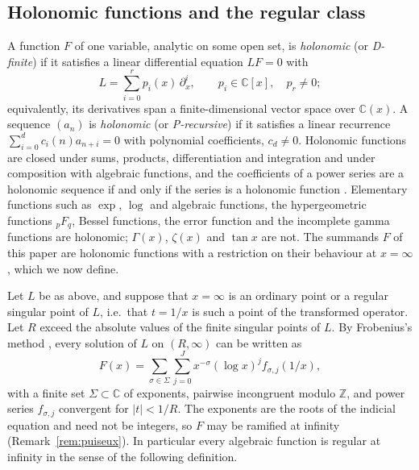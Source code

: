 \documentclass[11pt,reqno]{amsart}
\theoremstyle{definition}
\theoremstyle{remark}
\newcommand{\ZZ}{\mathbb{Z}}
\newcommand{\CC}{\mathbb{C}}
\begin{document}
\subsection{Holonomic functions and the regular class}
A function $F$ of one variable, analytic on some open set, is \emph{holonomic} (or \emph{D-finite}) if it satisfies a
linear differential equation $LF = 0$ with
\[
  L = \sum_{i=0}^r p_i(x)\,\partial_x^i, \qquad p_i \in \CC[x], \quad p_r \ne 0;
\]
equivalently, its derivatives span a finite-dimensional vector space over $\CC(x)$. A sequence $(a_n)$ is
\emph{holonomic} (or \emph{P-recursive}) if it satisfies a linear recurrence $\sum_{i=0}^{d}c_i(n)a_{n+i} = 0$ with
polynomial coefficients, $c_d \ne 0$. Holonomic functions are closed under sums, products, differentiation and
integration and under composition with algebraic functions, and the coefficients of a power series are a holonomic
sequence if and only if the series is a holonomic function \cite{Sta80}. Elementary functions such as $\exp$, $\log$
and algebraic functions, the hypergeometric functions ${}_pF_q$, Bessel functions, the error function and the
incomplete gamma functions are holonomic; $\Gamma(x)$, $\zeta(x)$ and $\tan x$ are not. The summands $F$ of this paper
are holonomic functions with a restriction on their behaviour at $x = \infty$, which we now define.

Let $L$ be as above, and suppose that $x = \infty$ is an ordinary point or a regular singular point of $L$, i.e.\ that $t = 1/x$ is such a point of the transformed
operator. Let $R$ exceed the absolute values of the finite singular points of $L$. By Frobenius's method
\cite[\S16]{Inc26}, every solution of $L$ on $(R, \infty)$ can be written as
\begin{equation}\label{eq:frob}
  F(x) = \sum_{\sigma\in\Sigma}\sum_{j=0}^{J} x^{-\sigma}(\log x)^j f_{\sigma,j}(1/x),
\end{equation}
with a finite set $\Sigma \subset \CC$ of exponents, pairwise incongruent modulo $\ZZ$, and power series $f_{\sigma,j}$
convergent for $|t| < 1/R$. The exponents are the roots of the indicial equation and need not be integers, so $F$
may be ramified at infinity (Remark~\ref{rem:puiseux}). In particular every algebraic function
is regular at infinity in the sense of the following definition.
\end{document}
